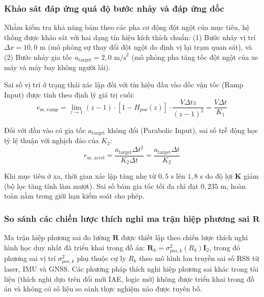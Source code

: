 \subsubsection{Khảo sát đáp ứng quá độ bước nhảy và đáp ứng dốc}

\hspace{0.5cm} Nhằm kiểm tra khả năng bám theo các pha cơ động đột ngột của mục tiêu, hệ thống được khảo sát với hai dạng tín hiệu kích thích chuẩn: (1) Bước nhảy vị trí $\Delta x = 10{,}0$ m (mô phỏng sự thay đổi đột ngột do định vị lại trạm quan sát), và (2) Bước nhảy gia tốc $a_{\text{target}} = 2{,}0\text{ m/s}^2$ (mô phỏng pha tăng tốc đột ngột của xe máy và máy bay không người lái).

Sai số vị trí ở trạng thái xác lập đối với tín hiệu đầu vào dốc vận tốc (Ramp Input) được tính theo định lý giá trị cuối:
\begin{equation}
e_{\text{ss, ramp}} = \lim_{z \to 1} (z-1) \cdot \left[ 1 - H_{\text{pos}}(z) \right] \cdot \frac{V \Delta t z}{(z-1)^2} = \frac{V \Delta t}{K_1}
\label{eq:ramp-steady-state-error}
\end{equation}

Đối với đầu vào có gia tốc $a_{\text{target}}$ không đổi (Parabolic Input), sai số trễ động học tỷ lệ thuận với nghịch đảo của $K_2$:
\begin{equation}
e_{\text{ss, accel}} = \frac{a_{\text{target}} \Delta t^2}{K_2 \Delta t} = \frac{a_{\text{target}} \Delta t}{K_2}
\label{eq:accel-steady-state-error}
\end{equation}

Khi mục tiêu ở xa, thời gian xác lập tăng nhẹ từ $0{,}5$ s lên $1{,}8$ s do độ lợi $\mathbf{K}$ giảm (bộ lọc tăng tính làm mượt). Sai số bám gia tốc tối đa chỉ đạt $0{,}235$ m, hoàn toàn nằm trong giới hạn kiểm soát cho phép.

\subsubsection{So sánh các chiến lược thích nghi ma trận hiệp phương sai \texorpdfstring{$\mathbf{R}$}{R}}

\hspace{0.5cm} Ma trận hiệp phương sai đo lường $\mathbf{R}$ được thiết lập theo chiến lược thích nghi hình học duy nhất đã triển khai trong đồ án: $\mathbf{R}_k = \sigma_{pos,k}^2(R_k) \mathbf{I}_2$, trong đó phương sai vị trí $\sigma_{pos,k}^2$ phụ thuộc cự ly $R_k$ theo mô hình lan truyền sai số RSS từ laser, IMU và GNSS. Các phương pháp thích nghi hiệp phương sai khác trong tài liệu (thích nghi dựa trên đổi mới IAE, logic mờ) không được triển khai trong đồ án và không có số liệu so sánh thực nghiệm nào được tuyên bố.

